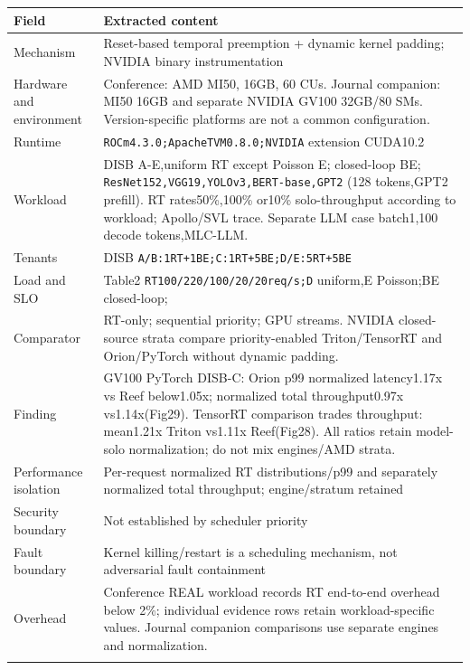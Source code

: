 \cite{P005}

\begin{longtable}{>{\raggedright\arraybackslash}p{}>{\raggedright\arraybackslash}p{}}
\toprule
\textbf{Field} & \textbf{Extracted content}\\\midrule\endhead
Mechanism & Reset-based temporal preemption + dynamic kernel padding; NVIDIA binary instrumentation\\\addlinespace
Hardware and environment & Conference: AMD MI50, 16GB, 60 CUs. Journal companion: MI50 16GB and separate NVIDIA GV100 32GB/80 SMs. Version-specific platforms are not a common configuration.\\\addlinespace
Runtime & \nolinkurl{ROCm4.3.0;ApacheTVM0.8.0;NVIDIA} extension CUDA10.2\\\addlinespace
Workload & DISB A-E,uniform RT except Poisson E; closed-loop BE; \nolinkurl{ResNet152,VGG19,YOLOv3,BERT-base,GPT2} (128 tokens,GPT2 prefill). RT rates50\%,100\% or10\% solo-throughput according to workload; Apollo/SVL trace. Separate LLM case batch1,100 decode tokens,MLC-LLM.\\\addlinespace
Tenants & DISB \nolinkurl{A/B:1RT+1BE;C:1RT+5BE;D/E:5RT+5BE}\\\addlinespace
Load and SLO & Table2 \nolinkurl{RT100/220/100/20/20req/s;D} uniform,E Poisson;BE closed-loop;\\\addlinespace
Comparator & RT-only; sequential priority; GPU streams. NVIDIA closed-source strata compare priority-enabled Triton/TensorRT and Orion/PyTorch without dynamic padding.\\\addlinespace
Finding & GV100 PyTorch DISB-C: Orion p99 normalized latency1.17x vs Reef below1.05x; normalized total throughput0.97x vs1.14x(Fig29). TensorRT comparison trades throughput: mean1.21x Triton vs1.11x Reef(Fig28). All ratios retain model-solo normalization; do not mix engines/AMD strata.\\\addlinespace
Performance isolation & Per-request normalized RT distributions/p99 and separately normalized total throughput; engine/stratum retained\\\addlinespace
Security boundary & Not established by scheduler priority\\\addlinespace
Fault boundary & Kernel killing/restart is a scheduling mechanism, not adversarial fault containment\\\addlinespace
Overhead & Conference REAL workload records RT end-to-end overhead below 2\%; individual evidence rows retain workload-specific values. Journal companion comparisons use separate engines and normalization.\\\addlinespace

\end{longtable}
